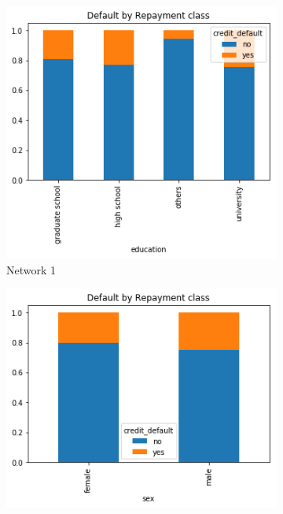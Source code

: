 \documentclass[a4paper]{article}
\begin{document}
    \begin{figure}
        \centering
        \begin{subfigure}[b]{0.475\textwidth}
            \centering
            \includegraphics[width=\textwidth]{../Code/Daniele/Plots/credit_default_education.png}
            \caption[Network2]%
            {{\small Network 1}}    
            \label{fig:default_edu}
        \end{subfigure}
        \hfill
        \begin{subfigure}[b]{0.475\textwidth}  
            \centering 
            \includegraphics[width=\textwidth]{../Code/Daniele/Plots/credit_default_sex.png}

\end{subfigure}
\end{figure}
\end{document}
